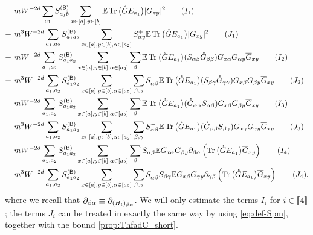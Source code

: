 \begin{align*}
 &~mW^{-2d}\sum_{a_1}S^{({\mathsf{B}})}_{a_1 b} \sum_{x\in [a],y\in [b]}\mathbb{E}  \operatorname{Tr} \big({\mathring G} E_{a_1} \big) |G_{xy}|^2 \tag{$I_1$} \\
 +&~m^3 W^{-2d}\sum_{a_1, a_2}S^{({\mathsf{B}})}_{a_1a_2} \sum_{x\in [a],y\in [b],\alpha \in [a_2]} S^+_{\alpha y} \mathbb{E}       
 \operatorname{Tr} \big({\mathring G} E_{a_1} \big) |G_{xy}|^2 \tag{$J_1$}\\
+&~m W^{-2d}\sum_{a_1, a_2}S^{({\mathsf{B}})}_{a_1a_2} \sum_{x\in [a],y\in [b],\alpha \in [a_2]}\sum_{\beta}\mathbb{E}       
 \operatorname{Tr} \big({\mathring G} E_{a_1} \big) (S_{\alpha\beta} {\mathring G}_{\beta\beta})  G_{x\alpha }G_{\alpha y} \overline G_{xy} \tag{$I_2$}\\
 +&~m^3 W^{-2d}\sum_{a_1, a_2}S^{({\mathsf{B}})}_{a_1a_2} \sum_{x\in [a],y\in [b],\alpha \in [a_2]}\sum_{\beta,\gamma}S^{+}_{\alpha\beta}\mathbb{E}       
 \operatorname{Tr} \big({\mathring G} E_{a_1} \big) (S_{\beta\gamma} {\mathring G}_{\gamma\gamma})  G_{x\beta }G_{\beta y} \overline G_{xy} \tag{$J_2$}\\
 +&~m W^{-2d}\sum_{a_1, a_2}S^{({\mathsf{B}})}_{a_1a_2} \sum_{x\in [a],y\in [b],\alpha \in [a_2]}\sum_{\beta}\mathbb{E}       
 \operatorname{Tr} \big({\mathring G} E_{a_1} \big) ({\mathring G}_{\alpha\alpha} S_{\alpha\beta})G_{x\beta }G_{\beta y} \overline G_{xy} \tag{$I_3$}\\
+&~m^3 W^{-2d}\sum_{a_1, a_2}S^{({\mathsf{B}})}_{a_1a_2} \sum_{x\in [a],y\in [b],\alpha \in [a_2]}\sum_{\beta,\gamma}S^{+}_{\alpha\beta} \mathbb{E}       
 \operatorname{Tr} \big({\mathring G} E_{a_1} \big) ({\mathring G}_{\beta\beta} S_{\beta\gamma})G_{x\gamma }G_{\gamma y} \overline G_{xy} \tag{$J_3$}\\
-&~m W^{-2d}\sum_{a_1, a_2}S^{({\mathsf{B}})}_{a_1a_2} \sum_{x\in [a],y\in [b],\alpha \in [a_2]}\sum_{\beta}S_{\alpha\beta} \mathbb{E}       
 G_{x\alpha }G_{\beta y} \partial_{\beta\alpha}\left(\operatorname{Tr} \big({\mathring G} E_{a_1} \big) \overline G_{xy}\right) \tag{$I_4$}\\
-&~m^3 W^{-2d}\sum_{a_1, a_2}S^{({\mathsf{B}})}_{a_1a_2} \sum_{x\in [a],y\in [b],\alpha \in [a_2]}\sum_{\beta,\gamma}S^+_{\alpha\beta}S_{\beta\gamma} \mathbb{E}      
 G_{x\beta}G_{\gamma y} \partial_{\gamma\beta}\left(\operatorname{Tr} \big({\mathring G} E_{a_1} \big) \overline G_{xy}\right) \tag{$J_4$},
\end{align*} 
where we recall that $\partial_{\beta\alpha}\equiv \partial_{(H_t)_{\beta\alpha}}$. We will only estimate the terms $I_i$ for $i\in\llbracket{4}\rrbracket$; the terms $J_i$ can be treated in exactly the same way by using \eqref{eq:def-Spm}, together with the bound \eqref{prop:ThfadC_short}. 


